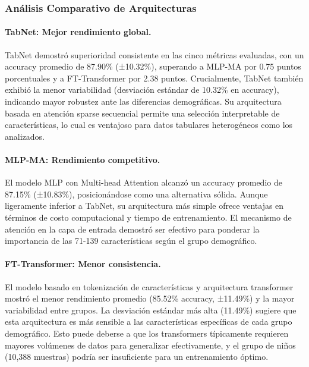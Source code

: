 \documentclass[12pt,a4paper]{article}
\begin{document}
\subsubsection{Análisis Comparativo de Arquitecturas}

\paragraph{TabNet: Mejor rendimiento global.} TabNet demostró superioridad consistente en las cinco métricas evaluadas, con un accuracy promedio de 87.90\% (±10.32\%), superando a MLP-MA por 0.75 puntos porcentuales y a FT-Transformer por 2.38 puntos. Crucialmente, TabNet también exhibió la menor variabilidad (desviación estándar de 10.32\% en accuracy), indicando mayor robustez ante las diferencias demográficas. Su arquitectura basada en atención sparse secuencial permite una selección interpretable de características, lo cual es ventajoso para datos tabulares heterogéneos como los analizados.

\paragraph{MLP-MA: Rendimiento competitivo.} El modelo MLP con Multi-head Attention alcanzó un accuracy promedio de 87.15\% (±10.83\%), posicionándose como una alternativa sólida. Aunque ligeramente inferior a TabNet, su arquitectura más simple ofrece ventajas en términos de costo computacional y tiempo de entrenamiento. El mecanismo de atención en la capa de entrada demostró ser efectivo para ponderar la importancia de las 71-139 características según el grupo demográfico.

\paragraph{FT-Transformer: Menor consistencia.} El modelo basado en tokenización de características y arquitectura transformer mostró el menor rendimiento promedio (85.52\% accuracy, ±11.49\%) y la mayor variabilidad entre grupos. La desviación estándar más alta (11.49\%) sugiere que esta arquitectura es más sensible a las características específicas de cada grupo demográfico. Esto puede deberse a que los transformers típicamente requieren mayores volúmenes de datos para generalizar efectivamente, y el grupo de niños (10,388 muestras) podría ser insuficiente para un entrenamiento óptimo.

\end{document}
